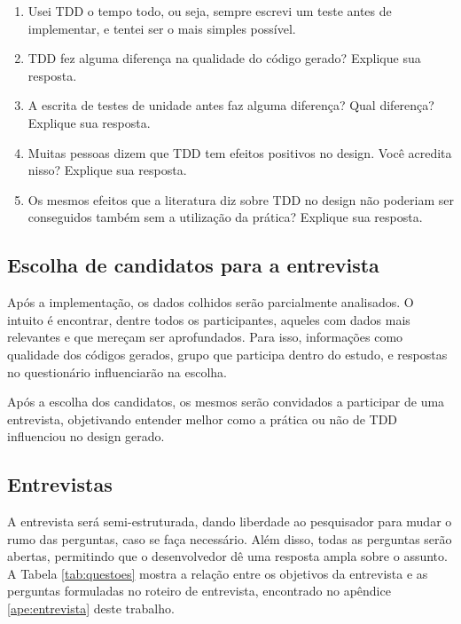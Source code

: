 \begin{enumerate}
	\item Usei TDD o tempo todo, ou seja, sempre escrevi um teste antes de implementar, e tentei ser o mais simples possível.
	\item TDD fez alguma diferença na qualidade do código gerado? Explique sua resposta.
	\item A escrita de testes de unidade antes faz alguma diferença? Qual diferença? Explique sua resposta.
	\item Muitas pessoas dizem que TDD tem efeitos positivos no design. Você acredita nisso? Explique sua resposta.
	\item Os mesmos efeitos que a literatura diz sobre TDD no design não poderiam ser conseguidos também sem a utilização da prática? Explique sua resposta.
\end{enumerate}

\subsection{Escolha de candidatos para a entrevista}

Após a implementação, os dados colhidos serão parcialmente analisados. O intuito
é encontrar, dentre todos os participantes, aqueles com dados mais relevantes
e que mereçam ser aprofundados.
Para isso, informações como qualidade dos códigos gerados, grupo que participa
dentro do estudo, e respostas no questionário influenciarão na escolha.

Após a escolha dos candidatos, os mesmos serão convidados a participar de
uma entrevista, objetivando entender melhor como a prática ou não de TDD
influenciou no design gerado.

\subsection{Entrevistas}
\label{sec:planejamento-estrategia-entrevistas}

A entrevista será semi-estruturada, dando liberdade ao
pesquisador para mudar o rumo das perguntas, caso se faça necessário.
Além disso, todas as perguntas serão abertas, permitindo que o desenvolvedor dê
uma resposta ampla sobre o assunto. A Tabela \ref{tab:questoes} mostra a
relação entre os objetivos da entrevista e as perguntas formuladas no roteiro de
entrevista, encontrado no apêndice \ref{ape:entrevista} deste trabalho.

